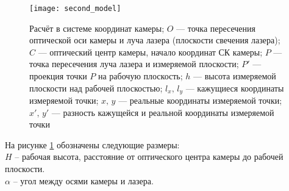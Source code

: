             \begin{figure}[H]
                \centering
                \texttt{[image: second\_model]}
                \caption{Расчёт в системе координат камеры;
                         $O$ --- точка пересечения оптической оси камеры и луча лазера (плоскости свечения лазера);
                         $C$ --- оптический центр камеры, начало координат СК камеры;
                         $P$ --- точка пересечения луча лазера и измеряемой плоскости;
                         $P'$ --- проекция точки $ P $ на рабочую плоскость;
                         $h$ --- высота измеряемой плоскости над рабочей плоскостью;
                         $l_x,\,l_y$ --- кажущиеся координаты измеряемой точки;
                         $x,\,y$ --- реальные координаты измеряемой точки;
                         $x',\,y'$ --- разность кажущейся и реальной координаты измеряемой точки}
                 \label{pic:second_model}
            \end{figure}
            
            На рисунке \ref{pic:second_model} обозначены следующие размеры:\\
            $ H $ -- рабочая высота, расстояние от оптического центра камеры до рабочей плоскости.\\
            $ \alpha $ -- угол между осями камеры и лазера.
            
